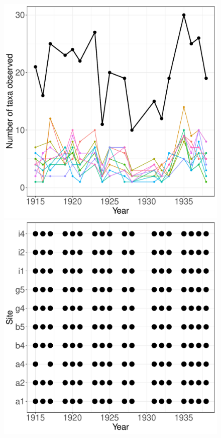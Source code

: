 \documentclass[11pt, oneside]{article}
\begin{document}
\begin{figure}[h!]
\includegraphics[scale = 0.4]{jrn-plants-compagnoni_num_taxa_over_time.pdf}
\includegraphics[scale = 0.4]{jrn-plants-compagnoni_spatiotemporal_sampling_effort.pdf}

\end{figure}
\end{document}
